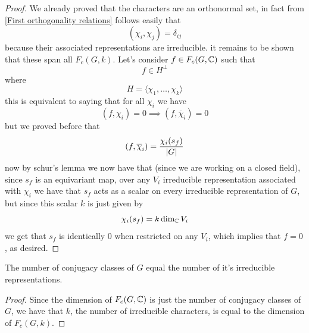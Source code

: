 \documentclass[11pt]{scrartcl}
\begin{document}
	\begin{proof}
		We already proved that the characters are an orthonormal set, in fact from \ref{First orthogonality relations} follows easily that 
		$$\left(\chi_i,\chi_j\right)=\delta_{ij}$$
		because their associated representations are irreducible.
		it remains to be shown that these span all $F_c(G,k)$. Let's consider $f\in F_c(G,\mathbb C)$ such that
		$$f\in H^\perp$$
		where
		$$H=\langle \chi_1,\dots ,\chi_k\rangle$$
		this is equivalent to saying that for all $\chi_i$ we have 
		$$\left(f,\chi_i\right)=0 \implies \left(f,\overline{\chi}_i\right)=0$$
		but we proved before that
		$$(f,\overline{\chi}_i)=\frac{\chi_i(s_f)}{\left\lvert G \right\rvert}$$
		now by schur's lemma we now have that (since we are working on a closed field), since $s_f$ is an equivariant map, over any $V_i$ irreducible representation associated with $\chi_i$ we have that $s_f$ acts as a scalar on every irreducible representation of $G$, but since this scalar $k$ is just given by 
		$$\chi_i(s_f)=k\dim_\mathbb C V_i$$
		we get that $s_f$ is identically $0$ when restricted on any $V_i$, which implies that $f=0$, as desired. 
	\end{proof}
	\begin{corollary}
		The number of conjugacy classes of $G$ equal the number of it's irreducible representations.
	\end{corollary}
	\begin{proof}
		Since the dimension of $F_c(G,\mathbb C)$ is just the number of conjugacy classes of $G$, we have that $k$, the number of irreducible characters, is equal to the dimension of $F_c(G,k)$.
	\end{proof}
	
\end{document}
